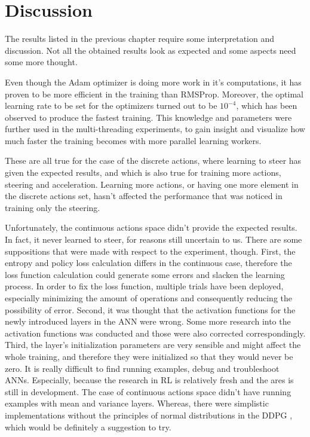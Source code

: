 \chapter{Discussion}\label{Discussion}
The results listed in the previous chapter require some interpretation and discussion. Not all the obtained results look as expected and some aspects need some more thought.

Even though the Adam optimizer is doing more work in it's computations, it has proven to be more efficient in the training than RMSProp. Moreover, the optimal learning rate to be set for the optimizers turned out to be $10^{-4}$, which has been observed to produce the fastest training. This knowledge and parameters were further used in the multi-threading experiments, to gain insight and visualize how much faster the training becomes with more parallel learning workers.

These are all true for the case of the discrete actions, where learning to steer has given the expected results, and which is also true for training more actions, steering and acceleration. Learning more actions, or having one more element in the discrete actions set, hasn't affected the performance that was noticed in training only the steering.

Unfortunately, the continuous actions space didn't provide the expected results. In fact, it never learned to steer, for reasons still uncertain to us. There are some suppositions that were made with respect to the experiment, though. First, the entropy and policy loss calculation differs in the continuous case, therefore the loss function calculation could generate some errors and slacken the learning process. In order to fix the loss function, multiple trials have been deployed, especially minimizing the amount of operations and consequently reducing the possibility of error. Second, it was thought that the activation functions for the newly introduced layers in the ANN were wrong. Some more research into the activation functions was conducted and those were also corrected correspondingly. Third, the layer's initialization parameters are very sensible and might affect the whole training, and therefore they were initialized so that they would never be zero. It is really difficult to find running examples, debug and troubleshoot ANNs. Especially, because the research in RL is relatively fresh and the ares is still in development. The case of continuous actions space didn't have running examples with mean and variance layers. Whereas, there were simplistic implementations without the principles of normal distributions in the DDPG \cite{DDPG_Torcs}, which would be definitely a suggestion to try.

